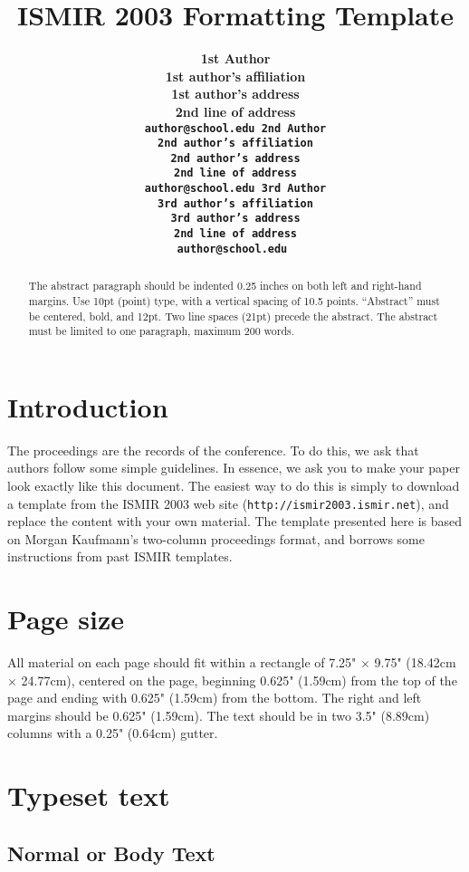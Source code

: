 \documentclass{article} \usepackage{proceed}
\title{ISMIR 2003 Formatting Template}
\author{ 
  \bf 1st Author \\ %
  1st author's affiliation \\ 
  1st author's address \\ 
  2nd line of address \\ 
  \tt author@school.edu %
\And 
  \bf 2nd Author \\ 
  2nd author's affiliation \\
  2nd author's address \\ 
  2nd line of address \\ 
  \tt author@school.edu 
\And 
  \bf 3rd Author \\ 
  3rd author's affiliation \\ 
  3rd author's address \\ 
  2nd line of address \\
  \tt author@school.edu
}
\begin{document}
\maketitle

\notice

\begin{abstract}
  The abstract paragraph should be indented 0.25 inches on both left
  and right-hand margins.  Use 10pt (point) type, with a vertical
  spacing of 10.5 points.  ``Abstract'' must be centered, bold, and
  12pt.  Two line spaces (21pt) precede the abstract.  The abstract
  must be limited to one paragraph, maximum 200 words.
\end{abstract}

\section{Introduction}

The proceedings are the records of the conference.  To do this, we ask
that authors follow some simple guidelines.  In essence, we ask you to
make your paper look exactly like this document.  The easiest way to
do this is simply to download a template from the ISMIR 2003 web site
(\texttt{http://ismir2003.ismir.net}), and replace the content with
your own material.  The template presented here is based on Morgan
Kaufmann's two-column proceedings format, and borrows some
instructions from past ISMIR templates.

\section{Page size}

All material on each page should fit within a rectangle of 7.25"
$\times$ 9.75" (18.42cm $\times$ 24.77cm), centered on the page,
beginning 0.625" (1.59cm) from the top of the page and ending with
0.625" (1.59cm) from the bottom. The right and left margins should be
0.625" (1.59cm).  The text should be in two 3.5" (8.89cm) columns with
a 0.25" (0.64cm) gutter.

\section{Typeset text}

\subsection{Normal or Body Text}
\end{document}
